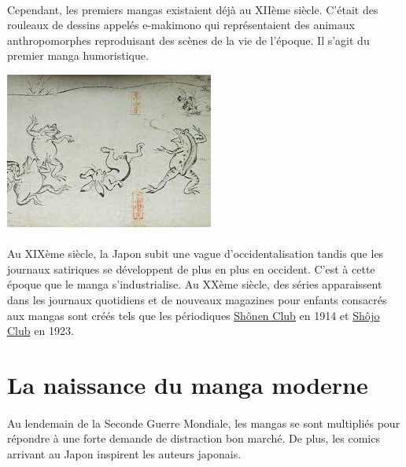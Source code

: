 \paragraph{}
Cependant, les premiers mangas existaient déjà au XIIème  siècle. C’était des rouleaux de dessins appelés e-makimono qui représentaient des animaux anthropomorphes reproduisant des scènes de la vie de l’époque. Il s’agit du premier manga humoristique.
\begin{center}
\includegraphics[scale=0.7]{emakimono.jpg}
\end{center}
\paragraph{}
Au XIXème siècle, la Japon subit une vague d’occidentalisation tandis que les journaux satiriques se développent de plus en plus en occident. C’est à cette époque que le manga s’industrialise. Au XXème siècle, des séries apparaissent dans les journaux quotidiens et de nouveaux magazines pour enfants consacrés aux mangas sont créés tels que les périodiques \underline{Shônen Club} en 1914 et \underline{Shôjo Club} en 1923.

\section{La naissance du manga moderne}
\paragraph{}
Au lendemain de la Seconde Guerre Mondiale, les mangas se sont multipliés pour répondre à une forte demande de distraction bon marché. De plus, les comics arrivant au Japon inspirent les auteurs japonais. 
